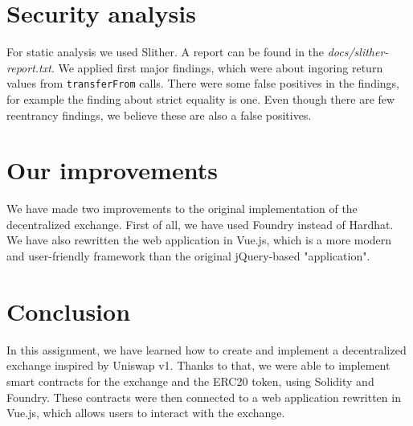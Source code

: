 \documentclass[11pt,a4paper]{article}
\begin{document}
\begin{table}
    \centering
    \caption{Code Coverage Metrics}
\end{table}

\section{Security analysis}

For static analysis we used Slither\cite{slitherGithub}. A report can be found
in the \emph{docs/slither-report.txt}. We applied first major findings, which
were about ingoring return values from \texttt{transferFrom} calls. There were
some false positives in the findings, for example the finding about strict
equality is one. Even though there are few reentrancy findings, we believe
these are also a false positives.

\section{Our improvements}

We have made two improvements to the original implementation of the
decentralized exchange. First of all, we have used Foundry instead of Hardhat.
We have also rewritten the web application in Vue.js, which is a more modern and
user-friendly framework than the original jQuery-based "application".

\section{Conclusion}

In this assignment, we have learned how to create and implement a
decentralized exchange inspired by Uniswap v1. Thanks to that, we were able to
implement smart contracts for the exchange and the ERC20 token, using
Solidity and Foundry. These contracts were then connected to a web application
rewritten in Vue.js, which allows users to interact with the exchange.



\end{document}
